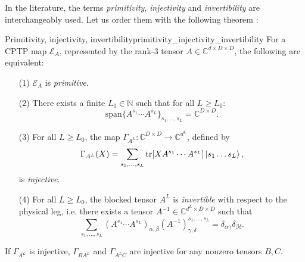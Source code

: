 \noindent In the literature, the terms \textit{primitivity}, \textit{injectivity} and \textit{invertibility} are interchangeably used. Let us order them with the following theorem \cite{fernandez2015frustration}:
\begin{theorem}{Primitivity, injectivity, invertibility}{primitivity_injectivity_invertibility}
For a CPTP map $\mathcal{E}_A$, represented by the rank-3 tensor $A \in \mathbb{C}^{d \times D \times D}$, the following are equivalent:
\begin{enumerate}
	\item[(1)] $\mathcal{E}_A$ is \textit{primitive}.
	\item[(2)] There exists a finite $L_0 \in \mathbb{N}$ such that for all $L \geq L_0$: 
	\begin{equation}
		\mathrm{span}\{A^{s_1} \cdots A^{s_L}\}_{s_1, \ldots, s_L} = \mathbb{C}^{D \times D}.
	\end{equation}
	\item[(3)] For all $L \geq L_0$, the map $\Gamma_{A^L}: \mathbb{C}^{D \times D} \rightarrow \mathbb{C}^{d^{L}}$, defined by 
	\begin{equation}
		\Gamma_{A^L}(X) = \sum\limits_{s_1, \ldots, s_L}\mathrm{tr}[X A^{s_1} \cdots A^{s_L}]\ket{s_1 \ldots s_L},
	\end{equation}
	is \textit{injective}.
	\item[(4)] For all $L \geq L_0$, the blocked tensor $A^L$ is \textit{invertible} with respect to the physical leg, i.e. there exists a tensor $A^{-1} \in \mathbb{C}^{d^L \times D \times D}$ such that 
	\begin{equation}
		\sum\limits_{s_1, \ldots, s_L} (A^{s_1} \cdots A^{s_L})_{\alpha, \beta}(A^{-1})^{s_1, \ldots, s_L}_{\gamma, \delta} = \delta_{\alpha \gamma} \delta_{\beta \delta}.
	\end{equation}
\end{enumerate}
If $\Gamma_{A^L}$ is injective, $\Gamma_{B A^L}$ and $\Gamma_{A^L C}$ are injective for any nonzero tensors $B, C$.
\end{theorem}
